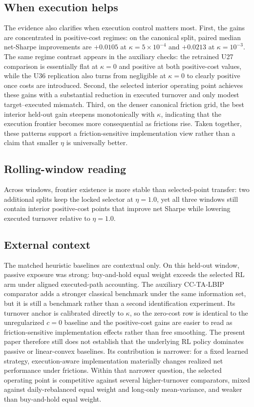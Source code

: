 \documentclass[10pt,twocolumn]{article}
\begin{document}
\subsection{When execution helps}
The evidence also clarifies when execution control matters most. First, the gains are concentrated in positive-cost regimes: on the canonical split, paired median net-Sharpe improvements are $+0.0105$ at $\kappa=5\times10^{-4}$ and $+0.0213$ at $\kappa=10^{-3}$. The same regime contrast appears in the auxiliary checks: the retrained U27 comparison is essentially flat at $\kappa=0$ and positive at both positive-cost values, while the U36 replication also turns from negligible at $\kappa=0$ to clearly positive once costs are introduced. Second, the selected interior operating point achieves these gains with a substantial reduction in executed turnover and only modest target--executed mismatch. Third, on the denser canonical friction grid, the best interior held-out gain steepens monotonically with $\kappa$, indicating that the execution frontier becomes more consequential as frictions rise. Taken together, these patterns support a friction-sensitive implementation view rather than a claim that smaller $\eta$ is universally better.

\subsection{Rolling-window reading}
Across windows, frontier existence is more stable than selected-point transfer: two additional splits keep the locked selector at $\eta=1.0$, yet all three windows still contain interior positive-cost points that improve net Sharpe while lowering executed turnover relative to $\eta=1.0$.

\subsection{External context}
The matched heuristic baselines are contextual only. On this held-out window, passive exposure was strong: buy-and-hold equal weight exceeds the selected RL arm under aligned executed-path accounting. The auxiliary CC-TA-LBIP comparator adds a stronger classical benchmark under the same information set, but it is still a benchmark rather than a second identification experiment. Its turnover anchor is calibrated directly to $\kappa$, so the zero-cost row is identical to the unregularized $c=0$ baseline and the positive-cost gains are easier to read as friction-sensitive implementation effects rather than free smoothing. The present paper therefore still does not establish that the underlying RL policy dominates passive or linear-convex baselines. Its contribution is narrower: for a fixed learned strategy, execution-aware implementation materially changes realized net performance under frictions. Within that narrower question, the selected operating point is competitive against several higher-turnover comparators, mixed against daily-rebalanced equal weight and long-only mean-variance, and weaker than buy-and-hold equal weight.
\end{document}
